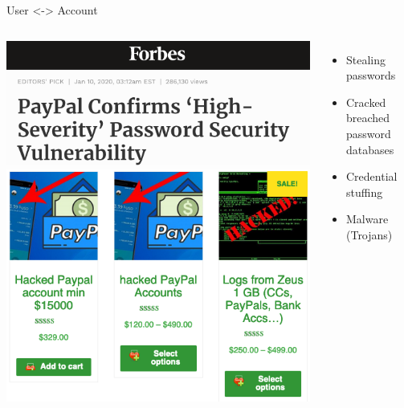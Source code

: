 \documentclass[nobackground,dvipsnames,table]{beamer}
\begin{document}
\begin{frame}{User <-> Account}
    \begin{columns}
            \includegraphics[width=\textwidth]{paypal-breach}
            \includegraphics[width=\textwidth]{hacked-paypal-accounts}
            \begin{itemize}
                \item Stealing passwords
                \item Cracked breached password databases
                \item Credential stuffing
                \item Malware (Trojans)
            \end{itemize}
    \end{columns}
\end{frame}
\end{document}
